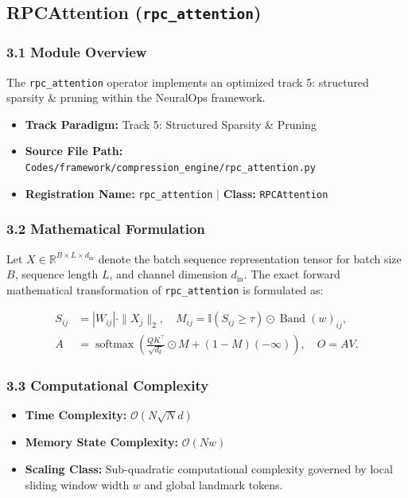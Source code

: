 \subsection{RPCAttention (\texttt{rpc\_attention})}
\label{sec:app_module_rpc\_attention}

\subsubsection*{3.1 Module Overview}
The \texttt{rpc\_attention} operator implements an optimized track 5: structured sparsity \& pruning within the NeuralOps framework.
\begin{itemize}
    \item \textbf{Track Paradigm:} Track 5: Structured Sparsity & Pruning
    \item \textbf{Source File Path:} \texttt{Codes/framework/compression\_engine/rpc\_attention.py}
    \item \textbf{Registration Name:} \texttt{rpc\_attention} $\mid$ \textbf{Class:} \texttt{RPCAttention}
\end{itemize}

\subsubsection*{3.2 Mathematical Formulation}
Let $X \in \mathbb{R}^{B \times L \times d_{\text{in}}}$ denote the batch sequence representation tensor for batch size $B$, sequence length $L$, and channel dimension $d_{\text{in}}$. The exact forward mathematical transformation of \texttt{rpc\_attention} is formulated as:

\begin{align}
S_{ij} &= |W_{ij}| \cdot \|X_j\|_2, \quad M_{ij} = \mathbb{I}(S_{ij} \ge \tau) \odot \operatorname{Band}(w)_{ij}, \\
A &= \operatorname{softmax}\left(\frac{Q K^\top}{\sqrt{d_k}} \odot M + (1 - M)(-\infty)\right), \quad O = A V.
\end{align}


\subsubsection*{3.3 Computational Complexity}
\begin{itemize}
    \item \textbf{Time Complexity:} $\mathcal{O}(N \sqrt{N} d)$
    \item \textbf{Memory State Complexity:} $\mathcal{O}(N w)$
    \item \textbf{Scaling Class:} Sub-quadratic computational complexity governed by local sliding window width $w$ and global landmark tokens.
\end{itemize}

